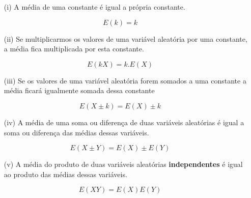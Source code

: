 \documentclass[a4paper,12pt]{report}
\begin{document}
{\begin{enumerate}
    \item[{(i)}] A média de uma constante é igual a própria constante.
\end{enumerate}

\begin{equation}\label{}
E(k)=k
\end{equation}


\begin{enumerate}
    \item[{(ii)}] Se multiplicarmos os valores de uma variável aleatória
    por uma constante, a média fica multiplicada por esta
    constante.
\end{enumerate}


\begin{equation}\label{}
E(kX)=k.E(X)
\end{equation}


\begin{enumerate}
    \item[{(iii)}] Se os valores de uma variável aleatória forem somados a
    uma constante a média ficará igualmente somada dessa constante
\end{enumerate}


\begin{equation}\label{}
E(X\pm k)=E(X)\pm k
\end{equation}


\begin{enumerate}
    \item[{(iv)}] A média de uma soma ou diferença de duas variáveis
    aleatórias é igual a soma ou diferença das médias dessas
    variáveis.
\end{enumerate}


\begin{equation}\label{}
E(X \pm Y)= E(X)\pm E(Y)
\end{equation}


\begin{enumerate}
    \item[{(v)}] A média do produto de duas variáveis
    aleatórias \textbf{independentes} é igual ao produto das
    médias dessas variáveis.
\end{enumerate}


\begin{equation}\label{}
E(XY)= E(X)E(Y)
\end{equation}








}
\end{document}
